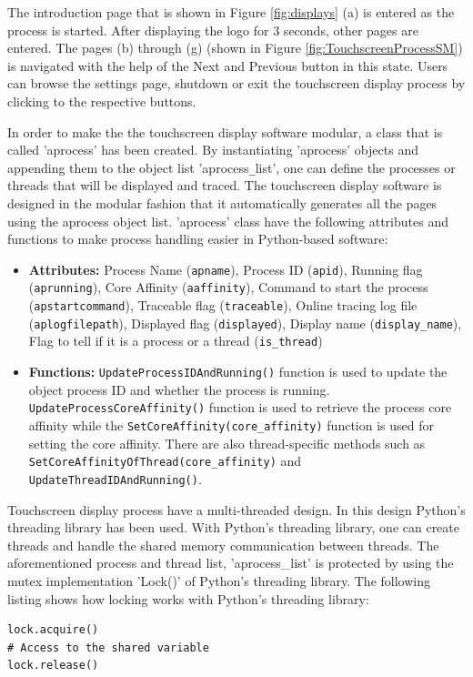 The introduction page that is shown in Figure \ref{fig:displays} (a) is entered as the process is started. After displaying the logo for 3 seconds, other pages are entered. The pages (b) through (g) (shown in Figure \ref{fig:TouchscreenProcessSM}) is navigated with the help of the Next and Previous button in this state. Users can browse the settings page, shutdown or exit the touchscreen display process by clicking to the respective buttons.

In order to make the the touchscreen display software modular, a class that is called 'aprocess' has been created. By instantiating 'aprocess' objects and appending them to the object list 'aprocess\texttt{\_}list', one can define the processes or threads that will be displayed and traced. The touchscreen display software is designed in the modular fashion that it automatically generates all the pages using the aprocess object list. 'aprocess' class have the following attributes and functions to make process handling easier in Python-based software:

\begin{itemize}
	\item \textbf{Attributes:} Process Name (\texttt{apname}), Process ID (\texttt{apid}), Running flag (\texttt{aprunning}), Core Affinity (\texttt{aaffinity}), Command to start the process (\texttt{apstartcommand}), Traceable flag (\texttt{traceable}), Online tracing log file (\texttt{aplogfilepath}), Displayed flag (\texttt{displayed}), Display name (\texttt{display\_name}), Flag to tell if it is a process or a thread (\texttt{is\_thread})
	\item \textbf{Functions:} \texttt{UpdateProcessIDAndRunning()} function is used to update the object process ID and whether the process is running. \texttt{UpdateProcessCoreAffinity()} function is used to retrieve the process core affinity while the  \texttt{SetCoreAffinity(core\_affinity)} function is used for setting the core affinity. There are also thread-specific methods such as \texttt{SetCoreAffinityOfThread(core\_affinity)} and \texttt{UpdateThreadIDAndRunning()}.
\end{itemize}

Touchscreen display process have a multi-threaded design. In this design Python's threading library \cite{pythonthreading} has been used. With Python's threading library, one can create threads and handle the shared memory communication between threads. The aforementioned process and thread list, 'aprocess{\_}list' is protected by using the mutex implementation 'Lock()' \cite{pythonthreading} of Python's threading library. The following listing shows how locking works with Python's threading library:
\begin{lstlisting}
lock.acquire()
# Access to the shared variable
lock.release()
\end{lstlisting}

